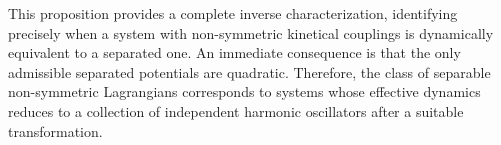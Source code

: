 \documentclass{rendiconti}
\begin{document}
This proposition provides a complete inverse characterization, identifying precisely when a system with non-symmetric kinetical couplings is dynamically equivalent to a separated one.
An immediate consequence is that the only admissible separated potentials are quadratic. 
Therefore, the class of separable non-symmetric Lagrangians corresponds to systems whose effective dynamics reduces to a collection of independent harmonic oscillators after a suitable transformation.


\nocite{*}



\end{document}
